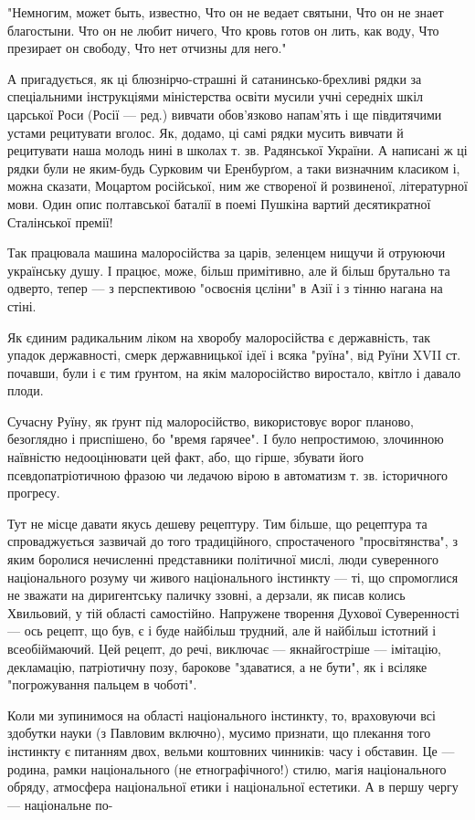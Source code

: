 "Немногим, может быть, известно, Что он не ведает святыни, Что он не знает благостыни. Что он не любит ничего, Что кровь готов он лить, как воду, Что презирает он свободу, Что нет отчизны для него."

А пригадується, як ці блюзнірчо-страшні й сатанинсько-брехливі рядки за спеціальними інструкціями міністерства освіти мусили учні середніх шкіл царської Роси (Росії — ред.) вивчати обов'язково напам'ять і ще півдитячими устами рецитувати вголос. Як, додамо, ці самі рядки мусить вивчати й рецитувати наша молодь нині в школах т. зв. Радянської України. А написані ж ці рядки були не яким-будь Сурковим чи Еренбурґом, а таки визначним класиком і, можна сказати, Моцартом російської, ним же створеної й розвиненої, літературної мови. Один опис полтавської баталії в поемі Пушкіна вартий десятикратної Сталінської премії!

Так працювала машина малоросійства за царів, зеленцем нищучи й отруюючи українську душу. І працює, може, більш примітивно, але й більш брутально та одверто, тепер — з перспективою "освоєнія цєліни" в Азії і з тінню нагана на стіні.

Як єдиним радикальним ліком на хворобу малоросійства є державність, так упадок державності, смерк державницької ідеї і всяка "руїна", від Руїни XVII ст. почавши, були і є тим ґрунтом, на якім малоросійство виростало, квітло і давало плоди.

Сучасну Руїну, як ґрунт під малоросійство, використовує ворог планово, безоглядно і приспішено, бо "время ґарячее". І було непростимою, злочинною наївністю недооцінювати цей факт, або, що гірше, збувати його псевдопатріотичною фразою чи ледачою вірою в автоматизм т. зв. історичного прогресу.

Тут не місце давати якусь дешеву рецептуру. Тим більше, що рецептура та спроваджується зазвичай до того традиційного, спростаченого "просвітянства", з яким боролися нечисленні представники політичної мислі, люди суверенного національного розуму чи живого національного інстинкту — ті, що спромоглися не зважати на диригентську паличку ззовні, а дерзали, як писав колись Хвильовий, у тій області самостійно. Напружене творення Духової Суверенності — ось рецепт, що був, є і буде найбільш трудний, але й найбільш істотний і всеобіймаючий. Цей рецепт, до речі, виключає — якнайгостріше — імітацію, декламацію, патріотичну позу, барокове "здаватися, а не бути", як і всіляке "погрожування пальцем в чоботі".

Коли ми зупинимося на області національного інстинкту, то, враховуючи всі здобутки науки (з Павловим включно), мусимо признати, що плекання того інстинкту є питанням двох, вельми коштовних чинників: часу і обставин. Це — родина, рамки національного (не етнографічного!) стилю, магія національного обряду, атмосфера національної етики і національної естетики. А в першу чергу — національне по-

